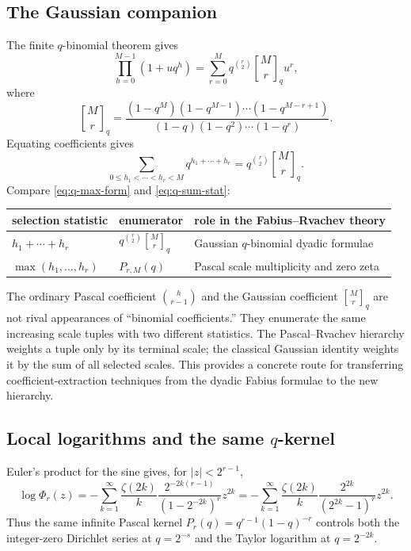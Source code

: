 \documentclass[11pt,a4paper]{article}
\theoremstyle{frontier}
\theoremstyle{definition}
\newcommand{\qbinom}[2]{\genfrac{[}{]}{0pt}{}{#1}{#2}_{q}}
\begin{document}
\subsection{The Gaussian companion}

The finite $q$-binomial theorem gives
\begin{equation}\label{eq:q-binomial-theorem}
 \prod_{h=0}^{M-1}(1+u q^h)
 =\sum_{r=0}^{M}q^{\binom r2}\qbinom{M}{r} u^r,
\end{equation}
where
\[
 \qbinom{M}{r}
 =\frac{(1-q^M)(1-q^{M-1})\cdots(1-q^{M-r+1})}
 {(1-q)(1-q^2)\cdots(1-q^r)}.
\]
Equating coefficients gives
\begin{equation}\label{eq:q-sum-stat}
 \sum_{0\le h_1<\cdots<h_r<M}q^{h_1+\cdots+h_r}
 =q^{\binom r2}\qbinom{M}{r}.
\end{equation}
Compare \eqref{eq:q-max-form} and \eqref{eq:q-sum-stat}:
\begin{center}
\begin{tabular}{@{}lll@{}}
\toprule
selection statistic & enumerator & role in the Fabius--Rvachev theory\\
\midrule
$h_1+\cdots+h_r$ & $q^{\binom r2}\qbinom{M}{r}$ & Gaussian $q$-binomial dyadic formulae\\
$\max(h_1,\ldots,h_r)$ & $P_{r,M}(q)$ & Pascal scale multiplicity and zero zeta\\
\bottomrule
\end{tabular}
\end{center}

\begin{resultbox}
The ordinary Pascal coefficient $\binom h{r-1}$ and the Gaussian coefficient $\qbinom{M}{r}$ are not rival appearances of ``binomial coefficients.''  They enumerate the same increasing scale tuples with two different statistics.  The Pascal--Rvachev hierarchy weights a tuple only by its terminal scale; the classical Gaussian identity weights it by the sum of all selected scales.  This provides a concrete route for transferring coefficient-extraction techniques from the dyadic Fabius formulae to the new hierarchy.
\end{resultbox}

\subsection{Local logarithms and the same \texorpdfstring{$q$}{q}-kernel}

Euler's product for the sine gives, for $|z|<2^{r-1}$,
\begin{equation}\label{eq:log-phir}
 \log\Phi_r(z)
 =-\sum_{k=1}^{\infty}\frac{\zeta(2k)}{k}
   \frac{2^{-2k(r-1)}}{(1-2^{-2k})^r}z^{2k}
 =-\sum_{k=1}^{\infty}\frac{\zeta(2k)}{k}
   \frac{2^{2k}}{(2^{2k}-1)^r}z^{2k}.
\end{equation}
Thus the same infinite Pascal kernel $P_r(q)=q^{r-1}(1-q)^{-r}$ controls both the integer-zero Dirichlet series at $q=2^{-s}$ and the Taylor logarithm at $q=2^{-2k}$.
\end{document}
